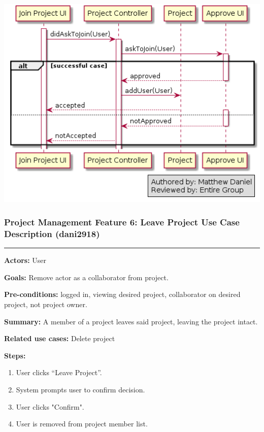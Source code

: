 \documentclass[twoside,letterpaper]{article}
\begin{document}
\includegraphics[width=\textwidth]{images/SequenceDiagrams/PMJoinProject}


\newpage




\subsubsection[Project Management Feature 6: Leave Project Use Case Description (dani2918)]{\rmfamily\bfseries\color{black}
	Project Management Feature 6: Leave Project Use Case Description  (dani2918)}
\hypertarget{RefHeading22059017292}{}
\bigskip

\vspace{2pt}
\hrule
\vspace{8pt}
\noindent \textbf{Actors:} User \newline

\noindent \textbf{Goals:} Remove actor as a collaborator from project. \newline

\noindent  \textbf{Pre-conditions:} logged in, viewing desired project, collaborator on desired project, not project owner.  \newline

\noindent \textbf{Summary:} A member of a project leaves said project, leaving the project intact. \newline

\noindent \textbf{Related use cases:} Delete project \newline

\noindent \textbf{Steps:} \begin{enumerate}
  \item User clicks ``Leave Project''.
  \item System prompts user to confirm decision.
  \item User clicks "Confirm".
  \item User is removed from project member list.
 \end{enumerate}
 
\end{document}
